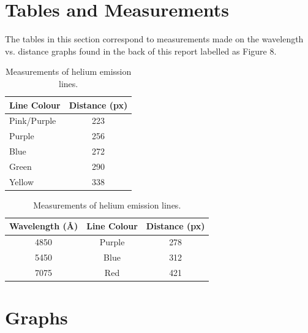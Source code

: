 \documentclass{article}
\begin{document}

\section{Tables and Measurements}
\label{sec:tnm}

The tables in this section correspond to measurements made on the wavelength vs. distance
graphs found in the back of this report labelled as Figure 8.

\begin{table}[h!]
\begin{center}
\begin{tabular}{l c}
\hline
Line Colour & Distance (px)\\
\hline
\hline
Pink/Purple & 223\\
Purple & 256\\
Blue & 272\\
Green & 290\\
Yellow & 338\\
\hline
\end{tabular}
\end{center}
\caption{Measurements of helium emission lines.\label{tab:helium}}
\end{table}

\begin{table}[h!]
\begin{center}
\begin{tabular}{c c c}
\hline
Wavelength (\AA) & Line Colour & Distance (px)\\
\hline
\hline
4850 & Purple & 278\\
5450 & Blue & 312\\
7075 & Red & 421\\
\hline
\end{tabular}
\end{center}
\caption{Measurements of helium emission lines.\label{tab:helium}}
\end{table}


\section{Graphs}
\end{document}
